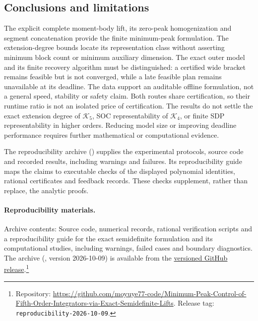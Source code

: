 \documentclass[pdflatex,sn-mathphys-num]{sn-jnl}
\theoremstyle{thmstyleone}
\theoremstyle{thmstyletwo}\newtheorem{remark}[theorem]{Remark}
\newcommand{\K}{\mathcal K}
\begin{document}
\subsection{Conclusions and limitations}\label{app:reproducibility}
The explicit complete moment-body lift, its zero-peak homogenization and
segment concatenation provide the finite minimum-peak formulation. The
extension-degree bounds locate its representation class without asserting
minimum block count or minimum auxiliary dimension.
The exact outer model and its finite recovery algorithm must be distinguished:
a certified wide bracket remains feasible but is not converged, while a late
feasible plan remains unavailable at its deadline. The data support an
auditable offline formulation, not a general speed, stability or safety claim.
Both routes share certification, so their runtime ratio is not an isolated
price of certification. The results do not settle the exact extension degree
of $\K_5$, SOC representability of $\K_4$, or finite SDP representability
in higher orders. Reducing model size or improving deadline performance
requires further mathematical or computational evidence.

The reproducibility archive () supplies the experimental protocols,
source code and recorded results, including warnings and failures. Its
reproducibility guide maps the claims to executable checks of the displayed
polynomial identities, rational certificates and feedback records. These
checks supplement, rather than replace, the analytic proofs.

\paragraph{Reproducibility materials.}
Archive contents: Source code, numerical records,
rational verification scripts and a reproducibility guide for the exact
semidefinite formulation and its computational studies, including warnings,
failed cases and boundary diagnostics.
The archive (, version 2026-10-09) is available from the
\href{https://github.com/moyuye77-code/Minimum-Peak-Control-of-Fifth-Order-Integrators-via-Exact-Semidefinite-Lifts/releases/tag/reproducibility-2026-10-09}{versioned GitHub release}.\footnote{Repository:
\begingroup\def\UrlBreaks{\do\/\do-\do.}
\url{https://github.com/moyuye77-code/Minimum-Peak-Control-of-Fifth-Order-Integrators-via-Exact-Semidefinite-Lifts}\endgroup.
Release tag: \texttt{reproducibility-2026-10-09}.}

\backmatter
\end{document}
